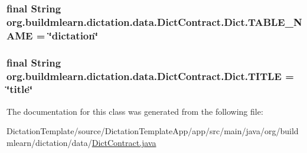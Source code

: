 \subsubsection[{\texorpdfstring{T\+A\+B\+L\+E\+\_\+\+N\+A\+ME}{TABLE_NAME}}]{\setlength{\rightskip}{0pt plus 5cm}final String org.\+buildmlearn.\+dictation.\+data.\+Dict\+Contract.\+Dict.\+T\+A\+B\+L\+E\+\_\+\+N\+A\+ME = \char`\"{}dictation\char`\"{}\hspace{0.3cm}{\ttfamily [static]}}\hypertarget{classorg_1_1buildmlearn_1_1dictation_1_1data_1_1DictContract_1_1Dict_a4a69132c90438c3b5d3f188a1789b6f4}{}\label{classorg_1_1buildmlearn_1_1dictation_1_1data_1_1DictContract_1_1Dict_a4a69132c90438c3b5d3f188a1789b6f4}
\subsubsection[{\texorpdfstring{T\+I\+T\+LE}{TITLE}}]{\setlength{\rightskip}{0pt plus 5cm}final String org.\+buildmlearn.\+dictation.\+data.\+Dict\+Contract.\+Dict.\+T\+I\+T\+LE = \char`\"{}title\char`\"{}\hspace{0.3cm}{\ttfamily [static]}}\hypertarget{classorg_1_1buildmlearn_1_1dictation_1_1data_1_1DictContract_1_1Dict_a16257378409fa6ad58eb9b75dfb4d685}{}\label{classorg_1_1buildmlearn_1_1dictation_1_1data_1_1DictContract_1_1Dict_a16257378409fa6ad58eb9b75dfb4d685}


The documentation for this class was generated from the following file\+:\begin{DoxyCompactItemize}
\item 
Dictation\+Template/source/\+Dictation\+Template\+App/app/src/main/java/org/buildmlearn/dictation/data/\hyperlink{DictContract_8java}{Dict\+Contract.\+java}\end{DoxyCompactItemize}
